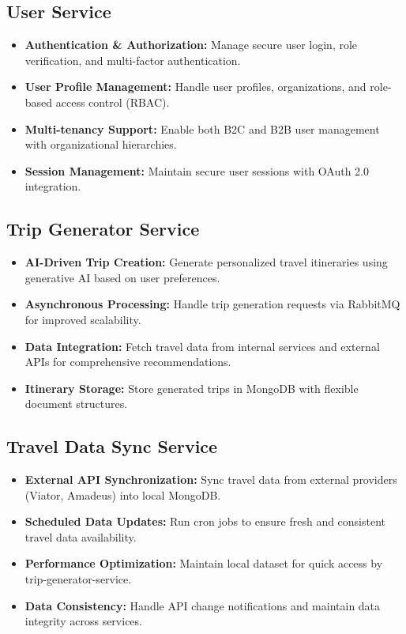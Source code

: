 \subsection{User Service}
\begin{itemize}
    \item \textbf{Authentication \& Authorization:} Manage secure user login, role verification, and multi-factor authentication.
    \item \textbf{User Profile Management:} Handle user profiles, organizations, and role-based access control (RBAC).
    \item \textbf{Multi-tenancy Support:} Enable both B2C and B2B user management with organizational hierarchies.
    \item \textbf{Session Management:} Maintain secure user sessions with OAuth 2.0 integration.
\end{itemize}

\subsection{Trip Generator Service}
\begin{itemize}
    \item \textbf{AI-Driven Trip Creation:} Generate personalized travel itineraries using generative AI based on user preferences.
    \item \textbf{Asynchronous Processing:} Handle trip generation requests via RabbitMQ for improved scalability.
    \item \textbf{Data Integration:} Fetch travel data from internal services and external APIs for comprehensive recommendations.
    \item \textbf{Itinerary Storage:} Store generated trips in MongoDB with flexible document structures.
\end{itemize}

\subsection{Travel Data Sync Service}
\begin{itemize}
    \item \textbf{External API Synchronization:} Sync travel data from external providers (Viator, Amadeus) into local MongoDB.
    \item \textbf{Scheduled Data Updates:} Run cron jobs to ensure fresh and consistent travel data availability.
    \item \textbf{Performance Optimization:} Maintain local dataset for quick access by trip-generator-service.
    \item \textbf{Data Consistency:} Handle API change notifications and maintain data integrity across services.
\end{itemize}

